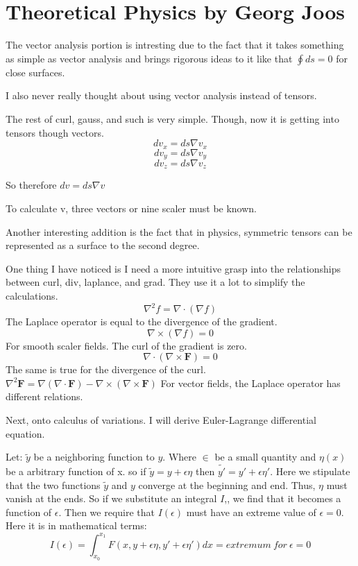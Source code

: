 \section{Theoretical Physics by Georg Joos}
\par The vector analysis portion is intresting due to the fact that it takes something as simple as vector analysis and brings rigorous ideas to it like that $\oint ds=0 $ for close surfaces. 
\par I also never really thought about using vector analysis instead of tensors. 
\par The rest of curl, gauss, and such is very simple. Though, now it is getting into tensors though vectors.
$$dv_x=ds\nabla v_x$$
$$dv_y=ds\nabla v_y$$
$$dv_z=ds\nabla v_z$$
\par So therefore $dv=ds \nabla v$
\par To calculate v, three vectors or nine scaler must be known.
\par Another interesting addition is the fact that in physics, symmetric tensors can be represented as a surface to the second degree.
\par One thing I have noticed is I need a more intuitive grasp into the relationships between curl, div, laplance, and grad. They use it a lot to simplify the calculations. 
$$\nabla^2 f = \nabla \cdot (\nabla f)$$
The Laplace operator is equal to the divergence of the gradient.
$$\nabla \times (\nabla f) = 0$$
For smooth scaler fields. The curl of the gradient is zero.
$$\nabla \cdot (\nabla \times \mathbf{F}) = 0$$
The same is true for the divergence of the curl.
$\nabla^2 \mathbf{F} = \nabla(\nabla \cdot \mathbf{F}) - \nabla \times (\nabla \times \mathbf{F})$
For vector fields, the Laplace operator has different relations.
\\
\par Next, onto calculus of variations. I will derive Euler-Lagrange differential equation.
\par Let: $\tilde{y}$ be a neighboring function to $y$. Where $\in$ be a small quantity and $\eta(x)$ be a arbitrary function of x. so if $\tilde{y}=y+\epsilon \eta$ then $\tilde{y'}=y'+ \epsilon \eta'$. Here we stipulate that the two functions $\tilde{y}$ and $y$ converge at the beginning and end. Thus, $\eta$ must vanish at the ends. So if we substitute an integral $I$,, we find that it becomes a function of $\epsilon$. Then we require that $I(\epsilon)$ must have an extreme value of $\epsilon=0$. Here it is in mathematical terms:
$$I(\epsilon)=\int^{x_1}_{x_0}F(x,y+\epsilon \eta, y'+\epsilon\eta')dx=extremum \ for \ \epsilon=0$$
